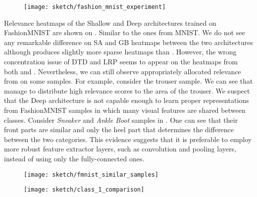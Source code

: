  \begin{figure}[!htb]
\centering
\texttt{[image: sketch/fashion\_mnist\_experiment]}
\label{fig:fashion_mnist_experiment}
\end{figure}

Relevance heatmaps of the Shallow and Deep architectures trained on  FashionMNIST  are shown on \addfigure{\ref{fig:fashion_mnist_experiment}}. Similar to the ones from MNIST. We do not see any remarkable difference on SA and GB heatmaps between the two architectures although  produces slightly more sparse heatmaps than . However, the wrong concentration issue of DTD and LRP seems to appear on the heatmaps from both  and . Nevertheless, we can still observe appropriately allocated relevance from  on some samples. For example, consider the trouser sample. We can see  that  manage to distribute high relevance scores to the area of the trouser.  We suspect that the Deep architecture is not capable enough to learn proper representations from FashionMNIST samples in which many visual features are shared between classes. Consider \textit{Sneaker} and \textit{Ankle Boot} samples in \addfigure{\ref{fig:fmnist_similar_samples}}. One can see that  their front parts are similar and only the heel part that determines the difference between the two categories. This evidence suggests that it is preferable to employ more robust feature extractor layers, such as convolution and pooling layers, instead of using only the fully-connected ones.

 \begin{figure}[!htb]
\centering
\texttt{[image: sketch/fmnist\_similar\_samples]}
\label{fig:fmnist_similar_samples}
\end{figure}

 \begin{figure}[!htb]
\centering
\texttt{[image: sketch/class\_1\_comparison]}
\label{fig:class_1_comparison}
\end{figure}

